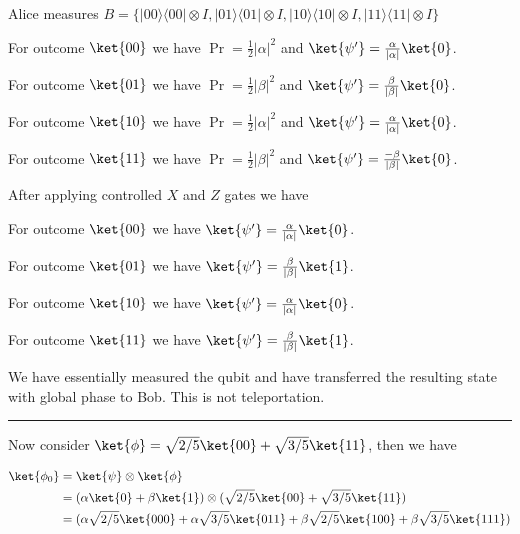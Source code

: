 \documentclass{article}
\newcommand{\ketbra}[2]{|#1\rangle\!\langle #2|}
\newcommand{\abs}[1]{\left\lvert #1 \right\rvert}
\begin{document}
\begin{enumerate}
        Alice measures $B=\{\ketbra{00}{00}\otimes I,\ketbra{01}{01}\otimes I,\ketbra{10}{10}\otimes I,\ketbra{11}{11}\otimes I\}$


        For outcome $\ket{00}$ we have $\Pr=\frac{1}{2}\abs{\alpha}^2$ and $\ket{\psi'}=\frac{\alpha}{\abs{\alpha}}\ket{0}$.

        For outcome $\ket{01}$ we have $\Pr=\frac{1}{2}\abs{\beta}^2$ and $\ket{\psi'}=\frac{\beta}{\abs{\beta}}\ket{0}$.

        For outcome $\ket{10}$ we have $\Pr=\frac{1}{2}\abs{\alpha}^2$ and $\ket{\psi'}=\frac{\alpha}{\abs{\alpha}}\ket{0}$.

        For outcome $\ket{11}$ we have $\Pr=\frac{1}{2}\abs{\beta}^2$ and $\ket{\psi'}=\frac{-\beta}{\abs{\beta}}\ket{0}$.

        After applying controlled $X$ and $Z$ gates we have

        For outcome $\ket{00}$ we have $\ket{\psi'}=\frac{\alpha}{\abs{\alpha}}\ket{0}$.

        For outcome $\ket{01}$ we have $\ket{\psi'}=\frac{\beta}{\abs{\beta}}\ket{1}$.

        For outcome $\ket{10}$ we have $\ket{\psi'}=\frac{\alpha}{\abs{\alpha}}\ket{0}$.

        For outcome $\ket{11}$ we have $\ket{\psi'}=\frac{\beta}{\abs{\beta}}\ket{1}$.


        We have essentially measured the qubit and have transferred the resulting state with global phase to Bob. This is not teleportation.

        \vspace{0.5cm}\hrule\vspace{0.5cm}

        Now consider $\ket{\phi}=\sqrt{2/5}\ket{00}+\sqrt{3/5}\ket{11}$, then we have

        $$\begin{aligned}
            \ket{\phi_0} & =\ket{\psi}\otimes\ket{\phi}                                                                             \\
                         & =(\alpha\ket{0}+\beta\ket{1})\otimes(\sqrt{2/5}\ket{00}+\sqrt{3/5}\ket{11})                              \\
                         & =(\alpha\sqrt{2/5}\ket{000}+\alpha\sqrt{3/5}\ket{011}+\beta\sqrt{2/5}\ket{100}+\beta\sqrt{3/5}\ket{111}) \\
          \end{aligned}$$


\end{enumerate}
\end{document}
